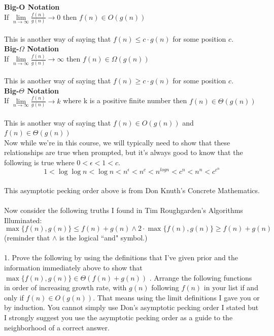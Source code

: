 \documentclass[12pt]{article}
\begin{document}
\textbf{Big-O Notation}\\
If $\lim\limits_{n\to\infty}{\frac{f(n)}{g(n)}}\to0$ then $f(n) \in O(g(n))$\\\\
This is another way of saying that $f(n) \leq c \cdot g(n)$ for some position $c$.\\
\textbf{Big-$\Omega$ Notation}\\
If $\lim\limits_{n\to\infty}{\frac{f(n)}{g(n)}}\to\infty$ then $f(n) \in \Omega(g(n))$\\\\
This is another way of saying that $f(n) \geq c \cdot g(n)$ for some position $c$.\\
\textbf{Big-$\Theta$ Notation}\\
If $\lim\limits_{n\to\infty}{\frac{f(n)}{g(n)}}\to k$ where k is a positive finite number then $f(n) \in \Theta(g(n))$\\\\
This is another way of saying that $f(n) \in O(g(n))$ and $f(n) \in \Theta(g(n))$\.\\
Now while we're in this course, we will typically need to show that these relationships are true when prompted, but it's always good to know that the following is true where \begin{math}0 < \epsilon < 1 < c\end{math}.\\
\[1 < \log{\log{n}} < \log{n} < n^{\epsilon} < n^c < n^{log{n}} < c^n < n^n < c^{c^{n}}\]\\
This asymptotic pecking order above is from Don Knuth's Concrete Mathematics.\\\\
\newpage
Now consider the following truths I found in Tim Roughgarden's Algorithms Illuminated: \\
$$\max\{f(n),g(n)\} \leq f(n) + g(n) \land  2 \cdot \max\{f(n),g(n)\} \geq f(n) + g(n)$$
(reminder that $\land$ is the logical ``and" symbol.)\\\\
1. Prove the following  by using the definitions that I've given prior and the information immediately above to show that $\max\{f(n),g(n)\}\in\Theta(f(n) + g(n))$
\newpage
{}. Arrange the following functions in order of increasing growth rate, with $g(n)$ following $f(n)$ in your list if and only if $f(n) \in O(g(n))$. That means using the limit definitions I gave you or by induction. You cannot simply use Don's asymptotic pecking order I stated but I strongly suggest you use the asymptotic pecking order as a guide to the neighborhood of a correct answer.\\
\end{document}
